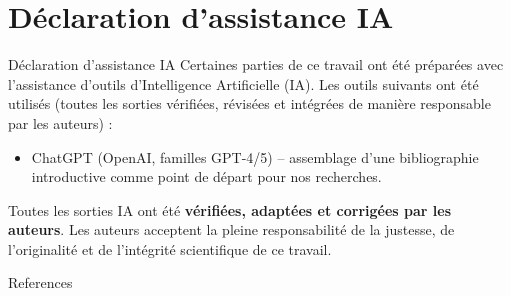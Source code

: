 \documentclass{beamer}
\begin{document}
\section*{Déclaration d'assistance IA}
\begin{frame}{Déclaration d'assistance IA}
  Certaines parties de ce travail ont été préparées avec l'assistance d'outils d'Intelligence Artificielle (IA). Les outils suivants ont été utilisés (toutes les sorties vérifiées, révisées et intégrées de manière responsable par les auteurs) :
  \begin{itemize}
    \item ChatGPT (OpenAI, familles GPT-4/5) – assemblage d'une bibliographie introductive comme point de départ pour nos recherches.
  \end{itemize}
  Toutes les sorties IA ont été \textbf{vérifiées, adaptées et corrigées par les auteurs}. Les auteurs acceptent la pleine responsabilité de la justesse, de l'originalité et de l'intégrité scientifique de ce travail.
\end{frame}

\begin{frame}[allowframebreaks]{References}
    \printbibliography
\end{frame}
\end{document}
